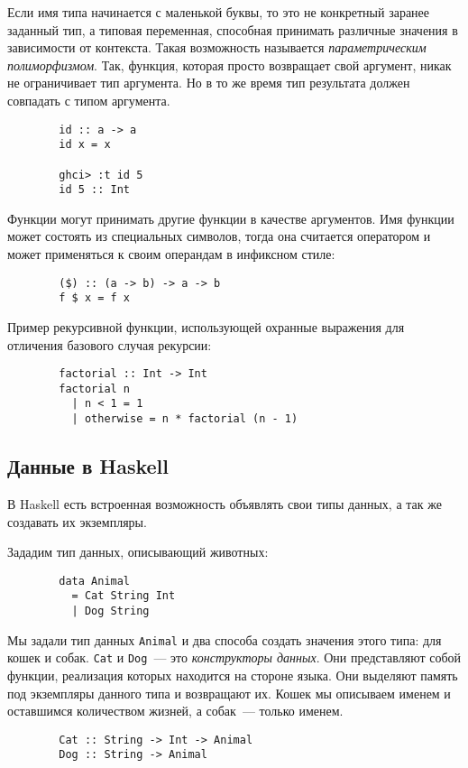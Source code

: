 \documentclass[12pt]{article}
\newcommand{\point}[1]{{\color{blue}\textit{#1}}} %
\begin{document}
    Если имя типа начинается с маленькой буквы, то это не конкретный заранее заданный тип, а типовая переменная, способная принимать различные значения в зависимости от контекста.
    Такая возможность называется \point{параметрическим полиморфизмом}.
    Так, функция, которая просто возвращает свой аргумент, никак не ограничивает тип аргумента.
    Но в то же время тип результата должен совпадать с типом аргумента.
    \begin{verbatim}
        id :: a -> a
        id x = x

        ghci> :t id 5
        id 5 :: Int
    \end{verbatim}

    Функции могут принимать другие функции в качестве аргументов.
    Имя функции может состоять из специальных символов, тогда она считается оператором и может применяться к своим операндам в инфиксном стиле:
    \begin{verbatim}
        ($) :: (a -> b) -> a -> b
        f $ x = f x
    \end{verbatim}

    Пример рекурсивной функции, использующей охранные выражения для отличения базового случая рекурсии:
    \begin{verbatim}
        factorial :: Int -> Int
        factorial n
          | n < 1 = 1
          | otherwise = n * factorial (n - 1)
    \end{verbatim}

    \subsection{Данные в Haskell}

    В Haskell есть встроенная возможность объявлять свои типы данных, а так же создавать их экземпляры.

    Зададим тип данных, описывающий животных:
    \begin{verbatim}
        data Animal
          = Cat String Int
          | Dog String
    \end{verbatim}

    Мы задали тип данных \texttt{Animal} и два способа создать значения этого типа: для кошек и собак.
    \texttt{Cat} и \texttt{Dog}~--- это \point{конструкторы данных}.
    Они представляют собой функции, реализация которых находится на стороне языка.
    Они выделяют память под экземпляры данного типа и возвращают их.
    Кошек мы описываем именем и оставшимся количеством жизней, а собак~--- только именем.
    \begin{verbatim}
        Cat :: String -> Int -> Animal
        Dog :: String -> Animal
    \end{verbatim}
\end{document}
